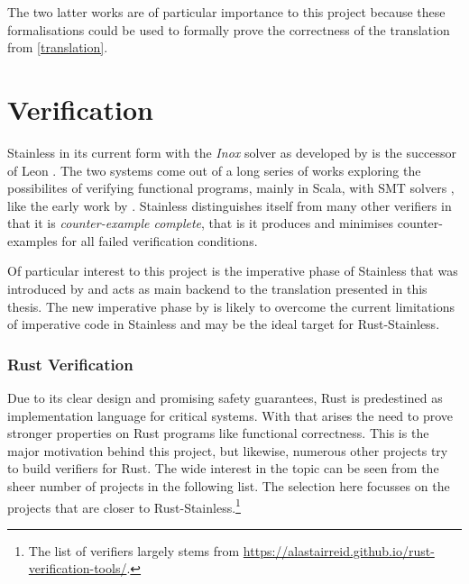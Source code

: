 The two latter works are of particular importance to this project because these
formalisations could be used to formally prove the correctness of the
translation from \autoref{translation}.

\section{Verification}

Stainless in its current form with the \emph{Inox} solver \cite{inox} as
developed by \citet*{stainless} is the successor of Leon \cite{leon}. The two
systems come out of a long series of works exploring the possibilites of
verifying functional programs, mainly in Scala, with SMT solvers \cite{smt},
like the early work by \citet{smrp}. Stainless distinguishes itself from many
other verifiers in that it is \emph{counter-example complete}, that is it
produces and minimises counter-examples for all failed verification conditions.

Of particular interest to this project is the imperative phase of Stainless that
was introduced by \citet{regb} and acts as main backend to the translation
presented in this thesis. The new imperative phase by \citet{new-imperative} is
likely to overcome the current limitations of imperative code in Stainless and
may be the ideal target for Rust-Stainless.

\subsubsection{Rust Verification}

Due to its clear design and promising safety guarantees, Rust is predestined as
implementation language for critical systems. With that arises the need to prove
stronger properties on Rust programs like functional correctness. This is the
major motivation behind this project, but likewise, numerous other projects try
to build verifiers for Rust. The wide interest in the topic can be seen from the
sheer number of projects in the following list. The selection here focusses on
the projects that are closer to Rust-Stainless.\footnote{The list of verifiers
largely stems from
\url{https://alastairreid.github.io/rust-verification-tools/}.}

